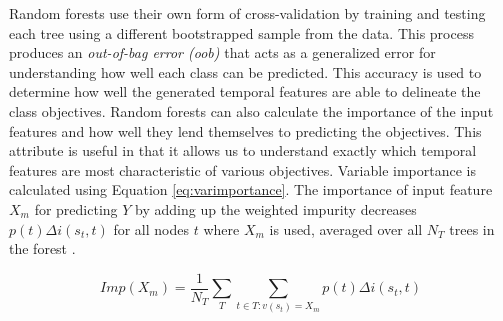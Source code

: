 Random forests use their own form of cross-validation by training and testing each tree using a different bootstrapped sample from the data. This process produces an \emph{out-of-bag error (oob)} that acts as a generalized error for understanding how well each class can be predicted. This accuracy is used to determine how well the generated temporal features are able to delineate the class objectives. Random forests can also calculate the importance of the input features and how well they lend themselves to predicting the objectives. This attribute is useful in that it allows us to understand exactly which temporal features are most characteristic of various objectives. Variable importance is calculated using Equation \ref{eq:varimportance}. The importance of input feature $X_m$ for predicting $Y$ by adding up the weighted impurity decreases $p(t)\Delta i(s_t,t)$ for all nodes $t$ where $X_m$ is used, averaged over all $N_T$ trees in the forest \cite{louppe2013understanding}.

\begin{equation}
Imp(X_m) = \frac{1}{N_T}\sum\limits_T\sum\limits_{t\in T:v(s_t)=X_m} p(t) \Delta i (s_t, t)
\label{eq:varimportance}
\end{equation}

